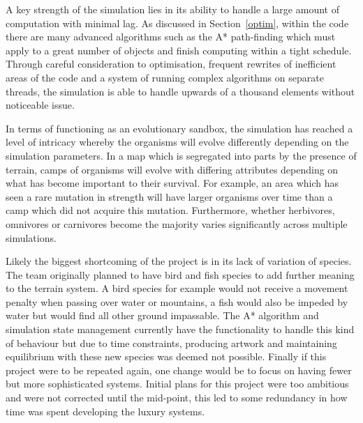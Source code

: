 \documentclass[a4paper, oneside, 11pt]{report}
\begin{document}
A key strength of the simulation lies in its ability to handle a large amount of computation with minimal lag. As discussed in Section~\ref{optim}, within the code there are many advanced algorithms such as the A* path-finding which must apply to a great number of objects and finish computing within a tight schedule. Through careful consideration to optimisation, frequent rewrites of inefficient areas of the code and a system of running complex algorithms on separate threads, the simulation is able to handle upwards of a thousand elements without noticeable issue.

In terms of functioning as an evolutionary sandbox, the simulation has reached a level of intricacy whereby the organisms will evolve differently depending on the simulation parameters. In a map which is segregated into parts by the presence of terrain, camps of organisms will evolve with differing attributes depending on what has become important to their survival. For example, an area which has seen a rare mutation in strength will have larger organisms over time than a camp which did not acquire this mutation. Furthermore, whether herbivores, omnivores or carnivores become the majority varies significantly across multiple simulations.

Likely the biggest shortcoming of the project is in its lack of variation of species. The team originally planned to have bird and fish species to add further meaning to the terrain system. A bird species for example would not receive a movement penalty when passing over water or mountains, a fish would also be impeded by water but would find all other ground impassable. The A* algorithm and simulation state management currently have the functionality to handle this kind of behaviour but due to time constraints, producing artwork and maintaining equilibrium with these new species was deemed not possible.
Finally if this project were to be repeated again, one change would be to focus on having fewer but more sophisticated systems. Initial plans for this project were too ambitious and were not corrected until the mid-point, this led to some redundancy in how time was spent developing the luxury systems.
\end{document}
